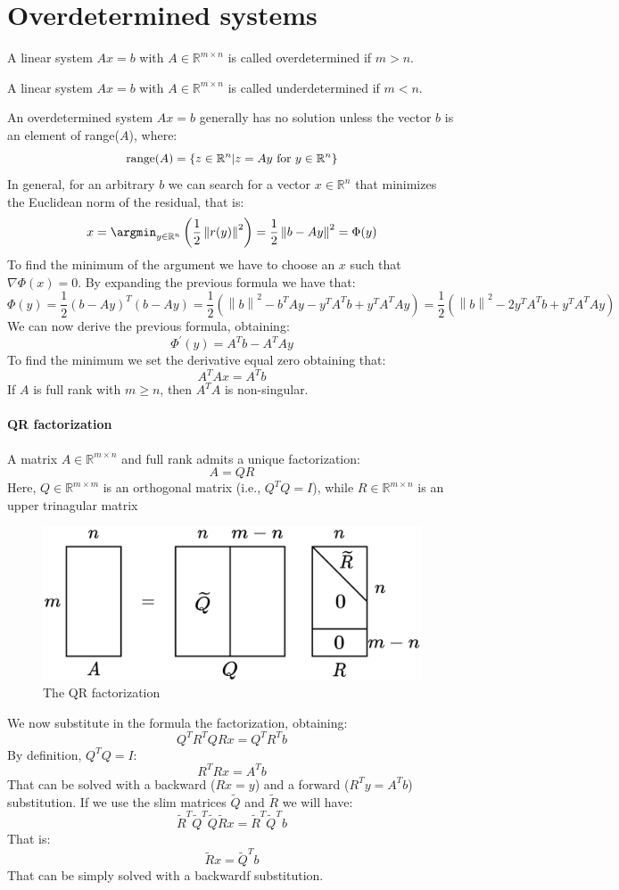\section{Overdetermined systems}

\begin{definition}
    A linear system $Ax=b$ with $A \in \mathbb{R}^{m \times n}$ is called overdetermined if $m>n$. 
\end{definition}
\begin{definition}
    A linear system $Ax=b$ with $A \in \mathbb{R}^{m \times n}$ is called underdetermined if $m<n$. 
\end{definition}

An overdetermined system $Ax=b$ generally has no solution unless the vector $b$ is an element of range($A$), where: 
\[\textnormal{range}(A)=\{z \in \mathbb{R}^n|z=Ay \textnormal{ for } y \in \mathbb{R}^n\}\]
In general, for an arbitrary $b$ we can search for a vector $x \in \mathbb{R}^n$ that minimizes the Euclidean norm of the residual, that is: 
\[x=\argmin_{y \in \mathbb{R}^n}\left( \dfrac{1}{2}\left\lVert r(y) \right\rVert^2 \right)=\dfrac{1}{2}\left\lVert b-Ay \right\rVert^2 = \Phi (y)\]
To find the minimum of the argument we have to choose an $x$ such that $\nabla\Phi(x)=0$. 
By expanding the previous formula we have that: 
\[\Phi(y)=\dfrac{1}{2}\left( b-Ay \right)^T\left( b-Ay \right)=\dfrac{1}{2}\left( \left\lVert b \right\rVert^2 -b^TAy-y^TA^Tb+y^TA^TAy\right)=\dfrac{1}{2}\left( \left\lVert b \right\rVert^2-2y^TA^Tb+y^TA^TAy\right)\]
We can now derive the previous formula, obtaining: 
\[\Phi^{'}(y)=A^Tb-A^TAy\]
To find the minimum we set the derivative equal zero obtaining that: 
\[A^TAx=A^Tb\]
If $A$ is full rank with $m \geq n$, then $A^TA$ is non-singular. 

\paragraph*{QR factorization}
A matrix $A \in \mathbb{R}^{m \times n}$ and full rank admits a unique factorization: 
\[A=QR\]
Here, $Q \in \mathbb{R}^{m \times m}$ is an orthogonal matrix (i.e., $Q^TQ=I$), while $R \in \mathbb{R}^{m \times n}$ is an upper trinagular matrix
\begin{figure}[H]
    \centering
    \includegraphics[width=0.5\linewidth]{images/qr.png}
    \caption{The QR factorization}
\end{figure}
We now substitute in the formula the factorization, obtaining: 
\[Q^TR^TQRx=Q^TR^Tb\]
By definition, $Q^TQ=I$: 
\[R^TRx=A^Tb\]
That can be solved with a backward ($Rx=y$) and a forward ($R^Ty=A^Tb$) substitution. 
If we use the slim matrices $\widetilde{Q}$ and $\widetilde{R}$ we will have: 
\[\widetilde{R}^T\widetilde{Q}^T\widetilde{Q}\widetilde{R}x=\widetilde{R}^T\widetilde{Q}^Tb\]
That is: 
\[\widetilde{R}x=\widetilde{Q}^Tb\]
That can be simply solved with a backwardf substitution. 

